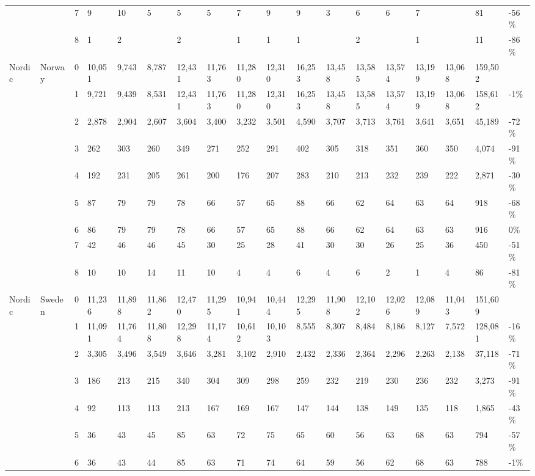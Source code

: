 \begin{longtable}{llllllllllllllllll}
   &  & 7 & 9 & 10 & 5 & 5 & 5 & 7 & 9 & 9 & 3 & 6 & 6 & 7 &  & 81 & -56\% \\ 
   &  & 8 & 1 & 2 &  & 2 &  & 1 & 1 & 1 &  & 2 &  & 1 &  & 11 & -86\% \\ 
  Nordic & Norway & 0 & 10,051 & 9,743 & 8,787 & 12,431 & 11,763 & 11,280 & 12,310 & 16,253 & 13,458 & 13,585 & 13,574 & 13,199 & 13,068 & 159,502 &  \\ 
   &  & 1 & 9,721 & 9,439 & 8,531 & 12,431 & 11,763 & 11,280 & 12,310 & 16,253 & 13,458 & 13,585 & 13,574 & 13,199 & 13,068 & 158,612 & -1\% \\ 
   &  & 2 & 2,878 & 2,904 & 2,607 & 3,604 & 3,400 & 3,232 & 3,501 & 4,590 & 3,707 & 3,713 & 3,761 & 3,641 & 3,651 & 45,189 & -72\% \\ 
   &  & 3 & 262 & 303 & 260 & 349 & 271 & 252 & 291 & 402 & 305 & 318 & 351 & 360 & 350 & 4,074 & -91\% \\ 
   &  & 4 & 192 & 231 & 205 & 261 & 200 & 176 & 207 & 283 & 210 & 213 & 232 & 239 & 222 & 2,871 & -30\% \\ 
   &  & 5 & 87 & 79 & 79 & 78 & 66 & 57 & 65 & 88 & 66 & 62 & 64 & 63 & 64 & 918 & -68\% \\ 
   &  & 6 & 86 & 79 & 79 & 78 & 66 & 57 & 65 & 88 & 66 & 62 & 64 & 63 & 63 & 916 & 0\% \\ 
   &  & 7 & 42 & 46 & 46 & 45 & 30 & 25 & 28 & 41 & 30 & 30 & 26 & 25 & 36 & 450 & -51\% \\ 
   &  & 8 & 10 & 10 & 14 & 11 & 10 & 4 & 4 & 6 & 4 & 6 & 2 & 1 & 4 & 86 & -81\% \\ 
  Nordic & Sweden & 0 & 11,236 & 11,898 & 11,862 & 12,470 & 11,295 & 10,941 & 10,444 & 12,295 & 11,908 & 12,102 & 12,026 & 12,089 & 11,043 & 151,609 &  \\ 
   &  & 1 & 11,091 & 11,764 & 11,808 & 12,298 & 11,174 & 10,612 & 10,103 & 8,555 & 8,307 & 8,484 & 8,186 & 8,127 & 7,572 & 128,081 & -16\% \\ 
   &  & 2 & 3,305 & 3,496 & 3,549 & 3,646 & 3,281 & 3,102 & 2,910 & 2,432 & 2,336 & 2,364 & 2,296 & 2,263 & 2,138 & 37,118 & -71\% \\ 
   &  & 3 & 186 & 213 & 215 & 340 & 304 & 309 & 298 & 259 & 232 & 219 & 230 & 236 & 232 & 3,273 & -91\% \\ 
   &  & 4 & 92 & 113 & 113 & 213 & 167 & 169 & 167 & 147 & 144 & 138 & 149 & 135 & 118 & 1,865 & -43\% \\ 
   &  & 5 & 36 & 43 & 45 & 85 & 63 & 72 & 75 & 65 & 60 & 56 & 63 & 68 & 63 & 794 & -57\% \\ 
   &  & 6 & 36 & 43 & 44 & 85 & 63 & 71 & 74 & 64 & 59 & 56 & 62 & 68 & 63 & 788 & -1\% \\ 

\end{longtable}
